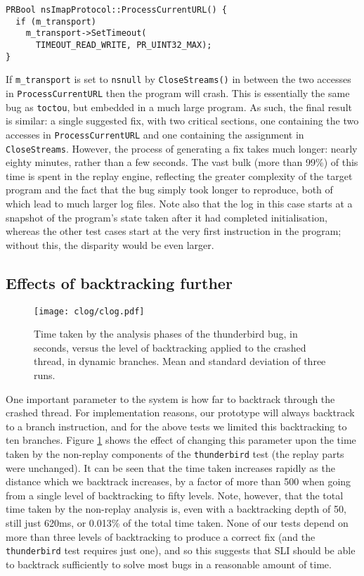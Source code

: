 \documentclass[10pt,twocolumn,preprint,natbib,authoryear]{sigplanconf}
\begin{document}
\begin{verbatim}
PRBool nsImapProtocol::ProcessCurrentURL() {
  if (m_transport)
    m_transport->SetTimeout(
      TIMEOUT_READ_WRITE, PR_UINT32_MAX);
}
\end{verbatim}

If \verb|m_transport| is set to \verb|nsnull| by \verb|CloseStreams()|
in between the two accesses in \verb|ProcessCurrentURL| then the
program will crash.  This is essentially the same bug as
\verb|toctou|, but embedded in a much large program.  As such, the
final result is similar: a single suggested fix, with two critical
sections, one containing the two accesses in \verb|ProcessCurrentURL|
and one containing the assignment in \verb|CloseStreams|.  However,
the process of generating a fix takes much longer: nearly eighty
minutes, rather than a few seconds.  The vast bulk (more than 99\%) of
this time is spent in the replay engine, reflecting the greater
complexity of the target program and the fact that the bug simply took
longer to reproduce, both of which lead to much larger log files.
Note also that the log in this case starts at a snapshot of the
program's state taken after it had completed initialisation, whereas
the other test cases start at the very first instruction in the
program; without this, the disparity would be even larger.

\subsection{Effects of backtracking further}
\label{sect:eval:backtrack}

\begin{figure}
\texttt{[image: clog/clog.pdf]}
\caption{Time taken by the analysis phases of the thunderbird bug, in
  seconds, versus the level of backtracking applied to the crashed
  thread, in dynamic branches.  Mean and standard deviation of three
  runs.}
\label{fig:eval:backtrack}
\end{figure}

One important parameter to the system is how far to backtrack through
the crashed thread.  For implementation reasons, our prototype will
always backtrack to a branch instruction, and for the above tests we
limited this backtracking to ten branches.  Figure
\ref{fig:eval:backtrack} shows the effect of changing this parameter
upon the time taken by the non-replay components of the
\verb|thunderbird| test (the replay parts were unchanged).  It can be
seen that the time taken increases rapidly as the distance which we
backtrack increases, by a factor of more than 500 when going from a
single level of backtracking to fifty levels.  Note, however, that the
total time taken by the non-replay analysis is, even with a
backtracking depth of 50, still just 620ms, or 0.013\% of the total
time taken.  None of our tests depend on more than three levels of
backtracking to produce a correct fix (and the \verb|thunderbird| test
requires just one), and so this suggests that SLI should be able to
backtrack sufficiently to solve most bugs in a reasonable amount of
time.
\end{document}
